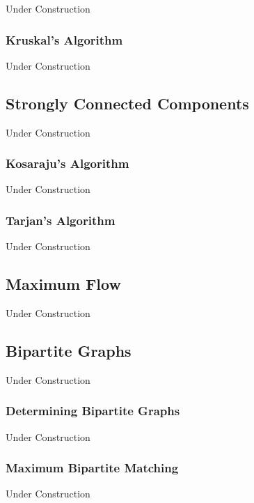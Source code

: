 Under Construction

\subsubsection{Kruskal's Algorithm}

Under Construction

\subsection{Strongly Connected Components}

Under Construction

\subsubsection{Kosaraju's Algorithm}

Under Construction

\subsubsection{Tarjan's Algorithm}

Under Construction

\subsection{Maximum Flow}

Under Construction

\subsection{Bipartite Graphs}

Under Construction

\subsubsection{Determining Bipartite Graphs}

Under Construction

\subsubsection{Maximum Bipartite Matching}

Under Construction

